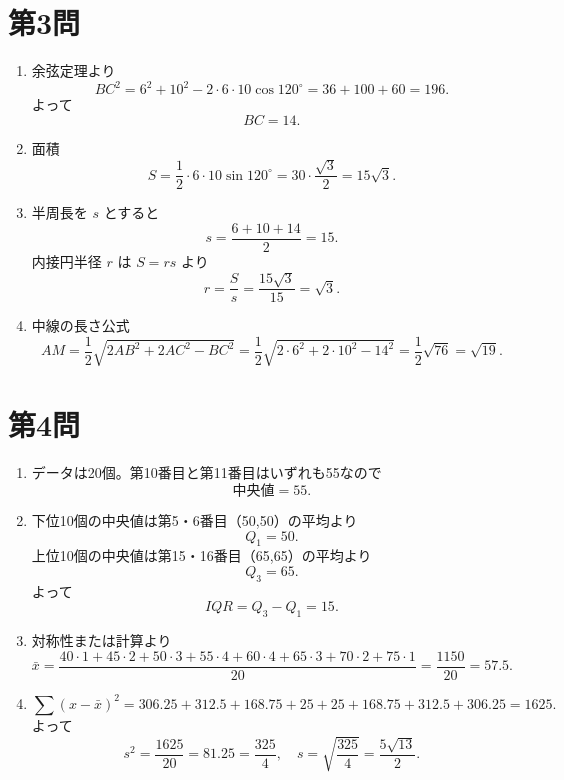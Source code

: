 \documentclass[a4paper,12pt]{jsarticle}
\begin{document}
\section*{第3問}
\begin{enumerate}[label=\arabic*.]
  \item 余弦定理より
  \[
  BC^2=6^2+10^2-2\cdot6\cdot10\cos120^\circ
  =36+100+60=196.
  \]
  よって
  \[
  BC=14.
  \]
  \item 面積
  \[
  S=\frac12\cdot6\cdot10\sin120^\circ
  =30\cdot\frac{\sqrt3}{2}=15\sqrt3.
  \]
  \item 半周長を $s$ とすると
  \[
  s=\frac{6+10+14}{2}=15.
  \]
  内接円半径 $r$ は $S=rs$ より
  \[
  r=\frac{S}{s}=\frac{15\sqrt3}{15}=\sqrt3.
  \]
  \item 中線の長さ公式
  \[
  AM=\frac12\sqrt{2AB^2+2AC^2-BC^2}
  =\frac12\sqrt{2\cdot6^2+2\cdot10^2-14^2}
  =\frac12\sqrt{76}=\sqrt{19}.
  \]
\end{enumerate}

\section*{第4問}
\begin{enumerate}[label=\arabic*.]
  \item データは20個。第10番目と第11番目はいずれも55なので
  \[
  \text{中央値}=55.
  \]
  \item 下位10個の中央値は第5・6番目（50,50）の平均より
  \[
  Q_1=50.
  \]
  上位10個の中央値は第15・16番目（65,65）の平均より
  \[
  Q_3=65.
  \]
  よって
  \[
  IQR=Q_3-Q_1=15.
  \]
  \item 対称性または計算より
  \[
  \bar{x}=\frac{40\cdot1+45\cdot2+50\cdot3+55\cdot4+60\cdot4+65\cdot3+70\cdot2+75\cdot1}{20}
  =\frac{1150}{20}=57.5.
  \]
  \item
  \[
  \sum (x-\bar{x})^2
  =306.25+312.5+168.75+25+25+168.75+312.5+306.25
  =1625.
  \]
  よって
  \[
  s^2=\frac{1625}{20}=81.25=\frac{325}{4},
  \quad
  s=\sqrt{\frac{325}{4}}=\frac{5\sqrt{13}}{2}.
  \]
\end{enumerate}
\end{document}
